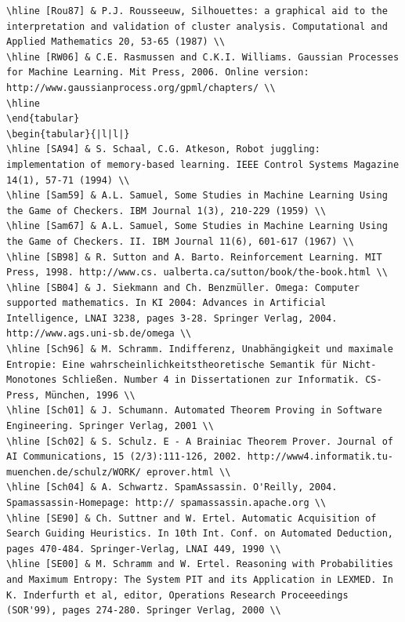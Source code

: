 \documentclass[10pt]{article}
\begin{document}
\begin{verbatim}
\hline [Rou87] & P.J. Rousseeuw, Silhouettes: a graphical aid to the interpretation and validation of cluster analysis. Computational and Applied Mathematics 20, 53-65 (1987) \\
\hline [RW06] & C.E. Rasmussen and C.K.I. Williams. Gaussian Processes for Machine Learning. Mit Press, 2006. Online version: http://www.gaussianprocess.org/gpml/chapters/ \\
\hline
\end{tabular}
\begin{tabular}{|l|l|}
\hline [SA94] & S. Schaal, C.G. Atkeson, Robot juggling: implementation of memory-based learning. IEEE Control Systems Magazine 14(1), 57-71 (1994) \\
\hline [Sam59] & A.L. Samuel, Some Studies in Machine Learning Using the Game of Checkers. IBM Journal 1(3), 210-229 (1959) \\
\hline [Sam67] & A.L. Samuel, Some Studies in Machine Learning Using the Game of Checkers. II. IBM Journal 11(6), 601-617 (1967) \\
\hline [SB98] & R. Sutton and A. Barto. Reinforcement Learning. MIT Press, 1998. http://www.cs. ualberta.ca/sutton/book/the-book.html \\
\hline [SB04] & J. Siekmann and Ch. Benzmüller. Omega: Computer supported mathematics. In KI 2004: Advances in Artificial Intelligence, LNAI 3238, pages 3-28. Springer Verlag, 2004. http://www.ags.uni-sb.de/omega \\
\hline [Sch96] & M. Schramm. Indifferenz, Unabhängigkeit und maximale Entropie: Eine wahrscheinlichkeitstheoretische Semantik für Nicht-Monotones Schließen. Number 4 in Dissertationen zur Informatik. CS-Press, München, 1996 \\
\hline [Sch01] & J. Schumann. Automated Theorem Proving in Software Engineering. Springer Verlag, 2001 \\
\hline [Sch02] & S. Schulz. E - A Brainiac Theorem Prover. Journal of AI Communications, 15 (2/3):111-126, 2002. http://www4.informatik.tu-muenchen.de/schulz/WORK/ eprover.html \\
\hline [Sch04] & A. Schwartz. SpamAssassin. O'Reilly, 2004. Spamassassin-Homepage: http:// spamassassin.apache.org \\
\hline [SE90] & Ch. Suttner and W. Ertel. Automatic Acquisition of Search Guiding Heuristics. In 10th Int. Conf. on Automated Deduction, pages 470-484. Springer-Verlag, LNAI 449, 1990 \\
\hline [SE00] & M. Schramm and W. Ertel. Reasoning with Probabilities and Maximum Entropy: The System PIT and its Application in LEXMED. In K. Inderfurth et al, editor, Operations Research Proceeedings (SOR'99), pages 274-280. Springer Verlag, 2000 \\

\end{verbatim}
\end{document}
